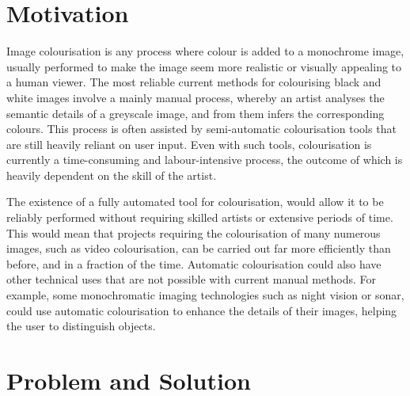 \documentclass{l4proj}
\begin{document}



\section{Motivation}

Image colourisation is any process where colour is added to a monochrome image, usually performed to make the image seem more realistic or visually appealing to a human viewer. The most reliable current methods for colourising black and white images involve a mainly manual process, whereby an artist analyses the semantic details of a greyscale image, and from them infers the corresponding colours. This process is often assisted by semi-automatic colourisation tools that are still heavily reliant on user input. Even with such tools, colourisation is currently a time-consuming and labour-intensive process, the outcome of which is heavily dependent on the skill of the artist.

The existence of a fully automated tool for colourisation, would allow it to be reliably performed without requiring skilled artists or extensive periods of time. This would mean that projects requiring the colourisation of many numerous images, such as video colourisation, can be carried out far more efficiently than before, and in a fraction of the time. Automatic colourisation could also have other technical uses that are not possible with current manual methods. For example, some monochromatic imaging technologies such as night vision or sonar, could use automatic colourisation to enhance the details of their images, helping the user to distinguish objects.

\section{Problem and Solution}
\end{document}
